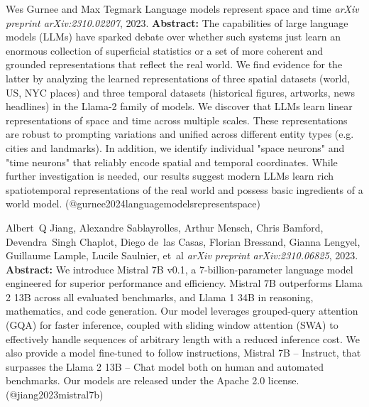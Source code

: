 \documentclass{article} %
\begin{document}
\begin{thebibliography}{}
 Wes Gurnee and Max Tegmark \newblock Language models represent space and time \newblock \emph{arXiv preprint arXiv:2310.02207}, 2023. \newblock \textbf{Abstract:} The capabilities of large language models (LLMs) have sparked debate over whether such systems just learn an enormous collection of superficial statistics or a set of more coherent and grounded representations that reflect the real world. We find evidence for the latter by analyzing the learned representations of three spatial datasets (world, US, NYC places) and three temporal datasets (historical figures, artworks, news headlines) in the Llama-2 family of models. We discover that LLMs learn linear representations of space and time across multiple scales. These representations are robust to prompting variations and unified across different entity types (e.g. cities and landmarks). In addition, we identify individual "space neurons" and "time neurons" that reliably encode spatial and temporal coordinates. While further investigation is needed, our results suggest modern LLMs learn rich spatiotemporal representations of the real world and possess basic ingredients of a world model. \newblock (@gurnee2024languagemodelsrepresentspace)

 Albert~Q Jiang, Alexandre Sablayrolles, Arthur Mensch, Chris Bamford, Devendra~Singh Chaplot, Diego de~las Casas, Florian Bressand, Gianna Lengyel, Guillaume Lample, Lucile Saulnier, et~al  \newblock \emph{arXiv preprint arXiv:2310.06825}, 2023. \newblock \textbf{Abstract:} We introduce Mistral 7B v0.1, a 7-billion-parameter language model engineered for superior performance and efficiency. Mistral 7B outperforms Llama 2 13B across all evaluated benchmarks, and Llama 1 34B in reasoning, mathematics, and code generation. Our model leverages grouped-query attention (GQA) for faster inference, coupled with sliding window attention (SWA) to effectively handle sequences of arbitrary length with a reduced inference cost. We also provide a model fine-tuned to follow instructions, Mistral 7B -- Instruct, that surpasses the Llama 2 13B -- Chat model both on human and automated benchmarks. Our models are released under the Apache 2.0 license. \newblock (@jiang2023mistral7b)


\end{thebibliography}
\end{document}
